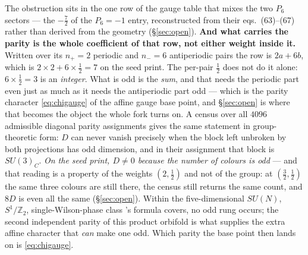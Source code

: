 \documentclass[11pt,a4paper]{article}
\newcommand{\ZZ}{\mathbb{Z}}
\newcommand{\su}[1]{SU(#1)}
\begin{document}
\noindent The obstruction sits in the one row of the gauge table that mixes the two $P_6$ sectors
--- the $-\tfrac72$ of the $P_6=-1$ entry, reconstructed from their eqs.~(63)--(67) rather than
derived from the geometry (\S\ref{sec:open}). \textbf{And what carries the parity is the whole
coefficient of that row, not either weight inside it.} Written over its $n_+=2$ periodic and
$n_-=6$ antiperiodic pairs the row is $2a+6b$, which is $2\times2+6\times\tfrac12=7$ on the seed
\cite{KM25} print. The per-pair $\tfrac12$ does not do it alone: $6\times\tfrac12=3$ is an
\emph{integer}. What is odd is the \emph{sum}, and that needs the periodic part even just as much
as it needs the antiperiodic part odd --- which is the parity character \eqref{eq:chigauge} of the
affine gauge base point, and \S\ref{sec:open} is where that becomes the object the whole fork turns
on. A census over all
$4096$ admissible diagonal parity assignments gives the same statement in group-theoretic form:
$D$ can never vanish precisely when the block left unbroken by both projections has odd dimension,
and in their assignment that block is $\su3_C$. \emph{On the seed \cite{KM25} print, $D\neq0$
because the number of colours is odd} --- and that reading is a property of the weights
$(2,\tfrac12)$ and not of the group: at $(\tfrac32,\tfrac12)$ the same three colours are still
there, the census still returns the same count, and $8D$ is even all the same (\S\ref{sec:open}).
Within the five-dimensional $\su{N}$, $S^1/\ZZ_2$, single-Wilson-phase class \cite{HY04}'s formula
covers, no odd rung occurs; the second independent parity of this product orbifold is what supplies
the extra affine character that \emph{can} make one odd. Which parity the base point then lands on
is \eqref{eq:chigauge}.
\end{document}
